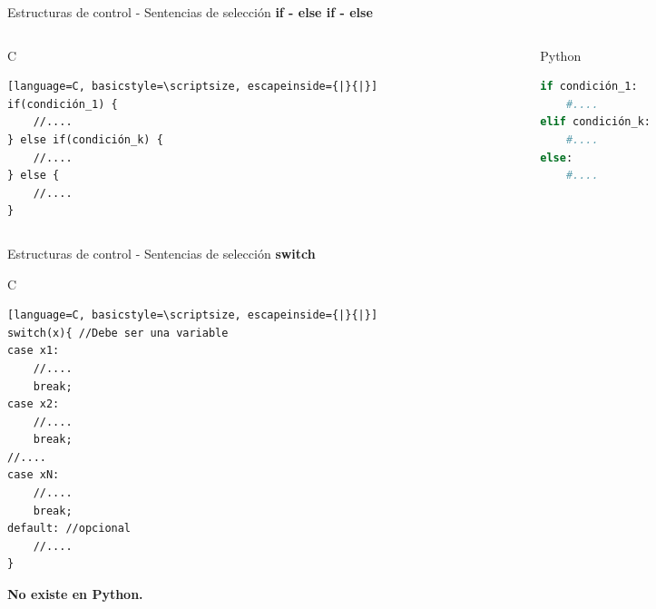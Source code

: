 \documentclass{beamer}
\begin{document}
\begin{frame}[fragile]{Estructuras de control - Sentencias de selección}
\textbf{if - else if - else}
\begin{columns}[t]
	\begin{column}{5cm}
	\begin{exampleblock}{C}
	\begin{lstlisting}[language=C, basicstyle=\scriptsize, escapeinside={|}{|}] 
if(condición_1) {
    //....
} else if(condición_k) {
    //....
} else {
    //....
}
		\end{lstlisting}\end{exampleblock}
	\end{column}
	\begin{column}{5cm}
		\begin{block}{Python}
		\begin{lstlisting}[language=Python, basicstyle=\scriptsize]
if condición_1:
    #....
elif condición_k:
    #....
else:
    #....
		\end{lstlisting}\end{block}
	\end{column}
\end{columns}
\end{frame}

\begin{frame}[fragile]{Estructuras de control - Sentencias de selección}
\textbf{switch}\\
\begin{exampleblock}{C}
\begin{lstlisting}[language=C, basicstyle=\scriptsize, escapeinside={|}{|}] 
switch(x){ //Debe ser una variable
case x1:                                     
	//.... 
	break; 
case x2: 
	//.... 
	break; 
//.... 
case xN: 
	//.... 
	break;  
default: //opcional
	//....
} 
\end{lstlisting}\end{exampleblock}
\bigskip
\textbf{No existe en Python.}
\end{frame}
\end{document}
